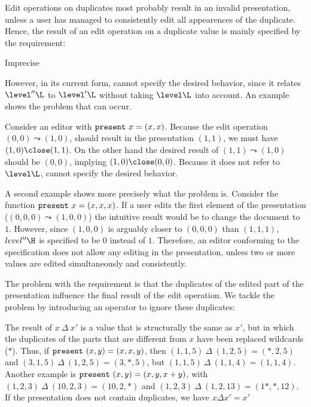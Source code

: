 Edit operations on duplicates most probably result in an invalid presentation, unless a user has managed to consistently edit all appearences of the duplicate. Hence, the result of an edit operation on a duplicate value is mainly specified by the  requirement: 


	{Imprecise}

However, in its current form,  cannot specify the desired behavior, since it relates $\level''\L$ to $\level'\L$ without taking $\level\L$ into account. An example shows the problem that can occur.

Consider an editor with ${\tt present}~x = (x,x)$. Because the edit operation $(0,0) \leadsto (1,0)$, should result in the presentation $(1,1)$, we must have $(1,0) \close (1,1)$. On the other hand the desired result of $(1,1) \leadsto (1,0)$ should be $(0,0)$, implying $(1,0) \close (0,0)$. Because it does not refer to $\level\L$,  cannot specify the desired behavior.


A second example shows more precisely what the problem is. Consider the function 
${\tt present}~x = (x,x,x)$. If a user edits the first element of the presentation
($(0,0,0) \leadsto (1,0,0)$) the intuitive result would be to change the document to $1$. However, since $(1,0,0)$ is arguably closer to $(0,0,0)$ than $(1,1,1)$, $level''\H$ is specified to be $0$ instead of $1$. Therefore, an editor conforming to the specification does not allow any editing in the presentation, unless two or more values are edited simultaneously and consistently. 


The problem with the  requirement is that the duplicates of the edited part of the presentation influence the final result of the edit operation. We tackle the problem by introducing an operator to ignore these duplicates:


The result of  $x~\Delta~x'$ is a value that is structurally the same as $x'$, but in which the duplicates of the parts that are different from $x$ have been replaced wildcards ($*$). Thus, if ${\tt present}~(x,y) = (x,x,y)$, then 
$(1,1,5)~\Delta~(1,2,5) = (*,2,5)$ and $(3,1,5)~\Delta~(1,2,5) = (3,*,5)$, but $(1,1,5)~\Delta~(1,1,4) = (1,1,4)$. Another example is ${\tt present}~(x,y) = (x,y,x+y)$, with $(1,2,3)~\Delta~(10,2,3) = (10,2,*)$ and 
$(1,2,3)~\Delta~(1,2,13) = (1*,*,12)$. If the presentation does not contain duplicates, we have $x \Delta x' = x'$

